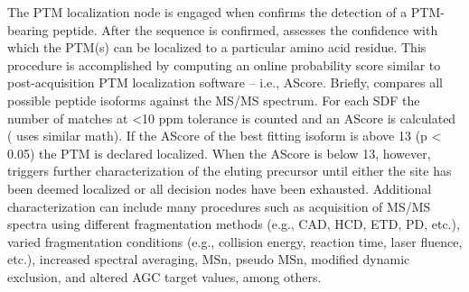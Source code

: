 The PTM localization node is engaged when \inseq{} confirms the detection of a PTM-bearing peptide. After the sequence is confirmed, \inseq{} assesses the confidence with which the PTM(s) can be localized to a particular amino acid residue. This procedure is accomplished by computing an online probability score similar to post-acquisition PTM localization software – i.e., AScore.\cite{ascore} Briefly, \inseq{} compares all possible peptide isoforms against the MS/MS spectrum. For each SDF the number of matches at <10 ppm tolerance is counted and an AScore is calculated (\inseq{} uses similar math). If the AScore of the best fitting isoform is above 13 (p < 0.05) the PTM is declared localized. When the AScore is below 13, however, \inseq{} triggers further characterization of the eluting precursor until either the site has been deemed localized or all decision nodes have been exhausted. Additional characterization can include many procedures such as acquisition of MS/MS spectra using different fragmentation methods (e.g., CAD, HCD, ETD, PD, etc.), varied fragmentation conditions (e.g., collision energy, reaction time, laser fluence, etc.), increased spectral averaging, MSn, pseudo MSn, modified dynamic exclusion, and altered AGC target values, among others.\cite{neutralloss}
